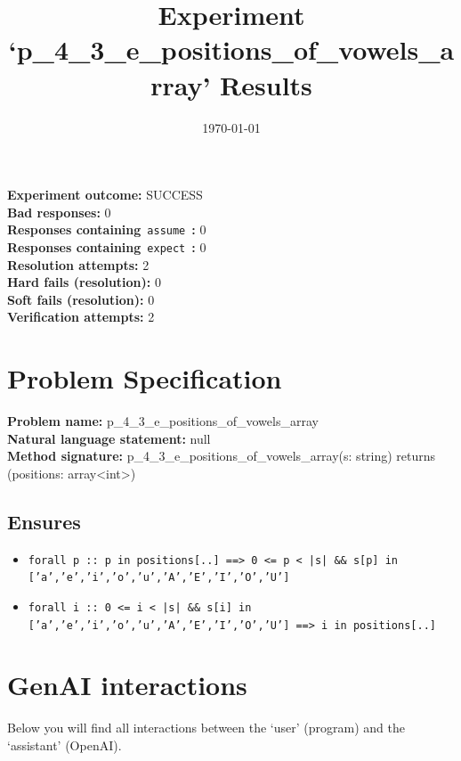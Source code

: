 \documentclass{article}
\begin{document}
\title{Experiment `p\_4\_3\_e\_positions\_of\_vowels\_array' Results}
\author{\today}
\date{}
\maketitle
\textbf{Experiment outcome: }SUCCESS
\\\textbf{Bad responses: }0
\\\textbf{Responses containing}~\texttt{assume}~\textbf{: }0
\\\textbf{Responses containing}~\texttt{expect}~\textbf{: }0
\\\textbf{Resolution attempts: }2
\\\textbf{Hard fails (resolution): }0
\\\textbf{Soft fails (resolution): }0
\\\textbf{Verification attempts: }2
\section*{Problem Specification}
\textbf{Problem name: }p\_4\_3\_e\_positions\_of\_vowels\_array
\\\textbf{Natural language statement: }null
\\\textbf{Method signature: }p\_4\_3\_e\_positions\_of\_vowels\_array(s: string) returns (positions: array<int>)
\subsection*{Ensures}
\begin{itemize}
\item \texttt{forall p :: p in positions[..] ==> 0 <= p < |s| \&\& s[p] in ['a','e','i','o','u','A','E','I','O','U']}
\item \texttt{forall i :: 0 <= i < |s| \&\& s[i] in ['a','e','i','o','u','A','E','I','O','U'] ==> i in positions[..]}
\end{itemize}
\clearpage
\section*{GenAI interactions}
Below you will find all interactions between the `user' (program) and the `assistant' (OpenAI).
\end{document}

